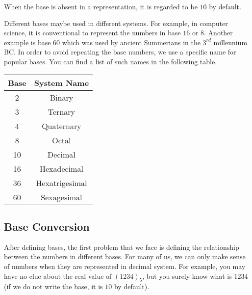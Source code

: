 \documentclass{subfile}
\begin{document}
	\begin{note}
		When the base is absent in a representation, it is regarded to be $10$ by default.
	\end{note}
	Different bases maybe used in different systems. For example, in computer science, it is conventional to represent the numbers in base $16$ or $8$. Another example is base $60$ which was used by ancient Summerians in the $3^{rd}$ millennium BC. In order to avoid repeating the base numbers, we use a specific name for popular bases. You can find a list of such names in the following table.
	\begin{center}
		\begin{tabular}{ | c | c | }
			\hline
			\textbf{Base} & \textbf{System Name} \\ \hline
			2 & Binary \\ \hline
			3 & Ternary \\ \hline
			4 & Quaternary \\ \hline
			8 & Octal \\ \hline
			10 & Decimal \\ \hline
			16 & Hexadecimal \\ \hline
			36 & Hexatrigesimal \\ \hline
			60 & Sexagesimal \\ \hline
		\end{tabular}
	\end{center}
	\subsection{Base Conversion}
	After defining bases, the first problem that we face is defining the relationship between the numbers in different bases. For many of us, we can only make sense of numbers when they are represented in decimal system. For example, you may have no clue about the real value of $(1234)_{5}$, but you surely know what is $1234$ (if we do not write the base, it is $10$ by default).
\end{document}
